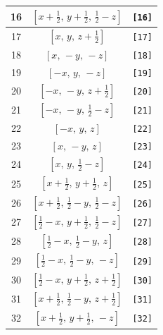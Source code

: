 \documentclass[fleqn,8pt]{jsarticle}
\begin{document}
\begin{longtable}{ccc}
16 & $\left[ x + \frac{1}{2},\, y + \frac{1}{2},\, \frac{1}{2} - z \right]$ & {\tt [16]} \\ \hline
17 & $\left[ x,\, y,\, z + \frac{1}{2} \right]$ & {\tt [17]} \\ \hline
18 & $\left[ x,\, - y,\, - z \right]$ & {\tt [18]} \\ \hline
19 & $\left[ - x,\, y,\, - z \right]$ & {\tt [19]} \\ \hline
20 & $\left[ - x,\, - y,\, z + \frac{1}{2} \right]$ & {\tt [20]} \\ \hline
21 & $\left[ - x,\, - y,\, \frac{1}{2} - z \right]$ & {\tt [21]} \\ \hline
22 & $\left[ - x,\, y,\, z \right]$ & {\tt [22]} \\ \hline
23 & $\left[ x,\, - y,\, z \right]$ & {\tt [23]} \\ \hline
24 & $\left[ x,\, y,\, \frac{1}{2} - z \right]$ & {\tt [24]} \\ \hline
25 & $\left[ x + \frac{1}{2},\, y + \frac{1}{2},\, z \right]$ & {\tt [25]} \\ \hline
26 & $\left[ x + \frac{1}{2},\, \frac{1}{2} - y,\, \frac{1}{2} - z \right]$ & {\tt [26]} \\ \hline
27 & $\left[ \frac{1}{2} - x,\, y + \frac{1}{2},\, \frac{1}{2} - z \right]$ & {\tt [27]} \\ \hline
28 & $\left[ \frac{1}{2} - x,\, \frac{1}{2} - y,\, z \right]$ & {\tt [28]} \\ \hline
29 & $\left[ \frac{1}{2} - x,\, \frac{1}{2} - y,\, - z \right]$ & {\tt [29]} \\ \hline
30 & $\left[ \frac{1}{2} - x,\, y + \frac{1}{2},\, z + \frac{1}{2} \right]$ & {\tt [30]} \\ \hline
31 & $\left[ x + \frac{1}{2},\, \frac{1}{2} - y,\, z + \frac{1}{2} \right]$ & {\tt [31]} \\ \hline
32 & $\left[ x + \frac{1}{2},\, y + \frac{1}{2},\, - z \right]$ & {\tt [32]} \\
\end{longtable}
\end{document}
